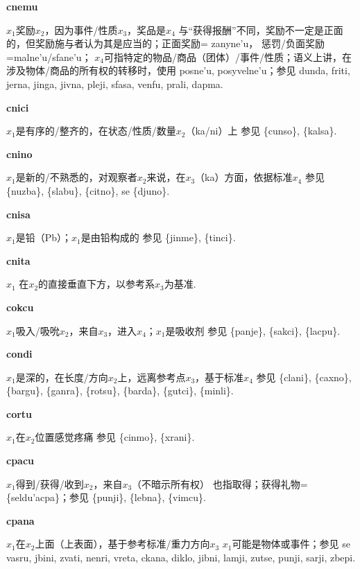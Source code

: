 \documentclass[notitlepage,twocolumn,a4paper,10pt]{book}
\begin{document}
{\sffamily\bfseries cnemu}\enspace {\ttfamily\bfseries[nem     ne'u]}  $x_1$奖励$x_2$，因为事件\slash{}性质$x_3$，奖品是$x_4$ \textemdash{} 与“获得报酬”不同，奖励不一定是正面的，但奖励施与者认为其是应当的；正面奖励= {zanyne'u}， 惩罚\slash{}负面奖励={malne'u}\slash{}{sfane'u}； $x_4$可指特定的物品\slash{}商品（团体）\slash{}事件\slash{}性质；语义上讲，在涉及物体\slash{}商品的所有权的转移时，使用 {posne'u}, {posyvelne'u}；参见 {dunda}, {friti}, {jerna}, {jinga}, {jivna}, {pleji}, {sfasa}, {venfu}, {prali}, {dapma}.

{\sffamily\bfseries cnici}\enspace {\ttfamily\bfseries[nic]}  $x_1$是有序的\slash{}整齐的，在状态\slash{}性质\slash{}数量$x_2$（ka\slash{}ni）上 \textemdash{} 参见 \{cunso\}, \{kalsa\}.

{\sffamily\bfseries cnino}\enspace {\ttfamily\bfseries[nin     ni'o]}  $x_1$是新的\slash{}不熟悉的，对观察者$x_2$来说，在$x_3$（ka）方面，依据标准$x_4$ \textemdash{} 参见 \{nuzba\}, \{slabu\}, \{citno\}, se \{djuno\}.

{\sffamily\bfseries cnisa}\enspace {\ttfamily\bfseries[nis]}  $x_1$是铅（Pb）；$x_1$是由铅构成的 \textemdash{} 参见 \{jinme\}, \{tinci\}.

{\sffamily\bfseries cnita}\enspace {\ttfamily\bfseries[nit     ni'a]}  $x_1$ 在$x_2$的直接垂直下方，以参考系$x_3$为基准.

{\sffamily\bfseries cokcu}\enspace {\ttfamily\bfseries[    cko]}  $x_1$吸入\slash{}吸吮$x_2$，来自$x_3$，进入$x_4$；$x_1$是吸收剂 \textemdash{} 参见 \{panje\}, \{sakci\}, \{lacpu\}.

{\sffamily\bfseries condi}  $x_1$是深的，在长度\slash{}方向$x_2$上，远离参考点$x_3$，基于标准$x_4$ \textemdash{} 参见 \{clani\}, \{caxno\}, \{bargu\}, \{ganra\}, \{rotsu\}, \{barda\}, \{gutci\}, \{minli\}.

{\sffamily\bfseries cortu}  $x_1$在$x_2$位置感觉疼痛 \textemdash{} 参见 \{cinmo\}, \{xrani\}.

{\sffamily\bfseries cpacu}\enspace {\ttfamily\bfseries[    cpa]}  $x_1$得到\slash{}获得\slash{}收到$x_2$，来自$x_3$（不暗示所有权） \textemdash{} 也指取得；获得礼物= \{seldu'acpa\}；参见 \{punji\}, \{lebna\}, \{vimcu\}.

{\sffamily\bfseries cpana} $x_1$在$x_2$上面（上表面），基于参考标准\slash{}重力方向$x_3$ \textemdash{} $x_1$可能是物体或事件；参见 se {vasru}, {jbini}, {zvati}, {nenri}, {vreta}, {ckana}, {diklo}, {jibni}, {lamji}, {zutse}, {punji}, {sarji}, {zbepi}.
\end{document}
